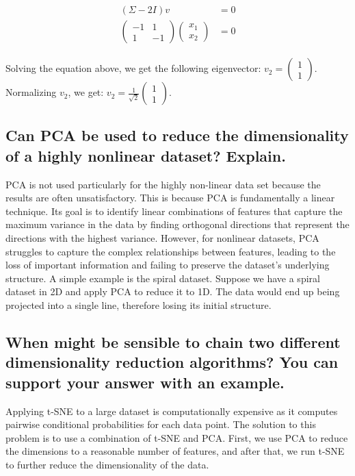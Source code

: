 \documentclass{article}
\begin{document}
\begin{eqnarray}
    \begin{aligned}
        (\Sigma - 2I)v &= 0 \\
        \begin{pmatrix}
            -1 & 1 \\
            1 & -1
        \end{pmatrix}
        \begin{pmatrix}
            x_1 \\
            x_2
        \end{pmatrix}
        &= 0 
    \end{aligned}
\end{eqnarray}

Solving the equation above, we get the following eigenvector: $v_2 = \begin{pmatrix}
    1 \\
    1
\end{pmatrix}$. Normalizing $v_2$, we get: $v_2 = \frac{1}{\sqrt{2}} \begin{pmatrix}
    1 \\
    1
\end{pmatrix}$.

\subsection{Can PCA be used to reduce the dimensionality of a highly nonlinear dataset? Explain.}
PCA is not used particularly for the highly non-linear data set because the results are often unsatisfactory. This is because PCA is fundamentally a linear technique. Its goal is to identify linear combinations of features that capture the maximum variance in the data by finding orthogonal directions that represent the directions with the highest variance. However, for nonlinear datasets, PCA struggles to capture the complex relationships between features, leading to the loss of important information and failing to preserve the dataset's underlying structure. A simple example is the spiral dataset. Suppose we have a spiral dataset in 2D and apply PCA to reduce it to 1D. The data would end up being projected into a single line, therefore losing its initial structure.


\subsection{When might be sensible to chain two different dimensionality reduction algorithms? You can support your answer with an example.}
Applying t-SNE to a large dataset is computationally expensive as it computes pairwise conditional probabilities for each data point. The solution to this problem is to use a combination of t-SNE and PCA. First, we use PCA to reduce the dimensions to a reasonable number of features, and after that, we run t-SNE to further reduce the dimensionality of the data.
\end{document}

